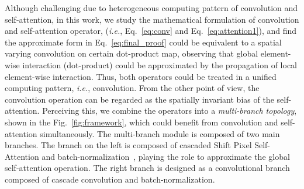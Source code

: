 \documentclass{article}
\begin{document}
Although challenging due to heterogeneous computing pattern of convolution and self-attention, in this work, we study the mathematical formulation of convolution and self-attention operator, (\emph{i.e.}, Eq.~\ref{eq:conv} and Eq.~\ref{eq:attention1}), and find the approximate form in Eq.~\ref{eq:final_proof} could be equivalent to a spatial varying convolution on certain dot-product map, observing that global element-wise interaction (dot-product) could be approximated by the propagation of local element-wise interaction.
Thus, both operators could be treated in a unified computing pattern, \emph{i.e.}, convolution.
From the other point of view, the convolution operation can be regarded as the spatially invariant bias of the self-attention.
Perceiving this, we combine the operators into a \emph{multi-branch topology}, shown in the Fig.~\ref{fig:framework}, which could benefit from convolution and self-attention simultaneously.
The multi-branch module is composed of two main branches.
The branch on the left is composed of cascaded Shift Pixel Self-Attention and batch-normalization~\cite{DBLP:conf/icml/IoffeS15}, playing the role to approximate the global self-attention operation.
The right branch is designed as a convolutional branch composed of cascade convolution and batch-normalization.
\end{document}
